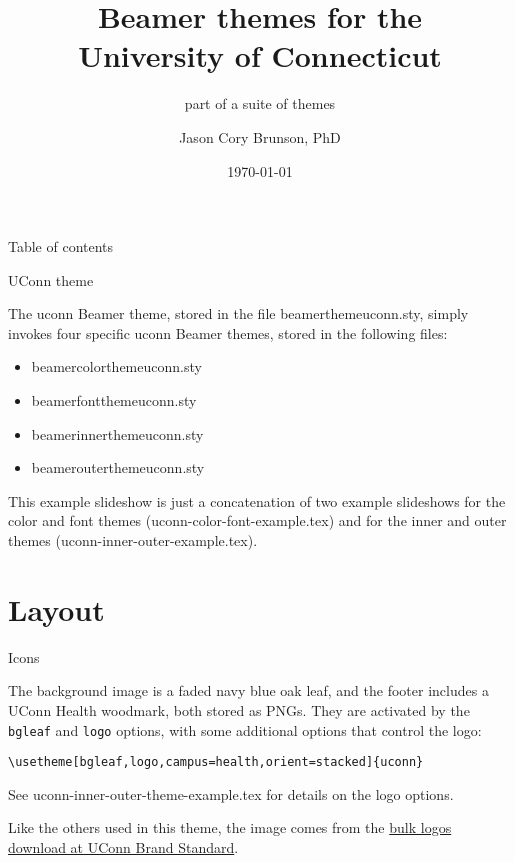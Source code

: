 \documentclass{beamer}
\title[Beamer themes for UConn]{Beamer themes for the\\ University of Connecticut}
\subtitle{part of a suite of themes}
\author[Cory Brunson]{Jason Cory Brunson, PhD}
\institute[UConn Health]{Center for Quantitative Medicine\\ University of Connecticut School of Medicine}
\date{\today}
\begin{document}
\begin{frame}
\titlepage
\end{frame}


\begin{frame}{Table of contents}
\tableofcontents
\end{frame}


\begin{frame}{UConn theme}

The {\ttfamily uconn} Beamer theme, stored in the file {\ttfamily beamerthemeuconn.sty}, simply invokes four specific {\ttfamily uconn} Beamer themes, stored in the following files:
\begin{itemize}
\ttfamily
\item beamercolorthemeuconn.sty
\item beamerfontthemeuconn.sty
\item beamerinnerthemeuconn.sty
\item beamerouterthemeuconn.sty
\end{itemize}

This example slideshow is just a concatenation of two example slideshows for the color and font themes ({\ttfamily uconn-color-font-example.tex}) and for the inner and outer themes ({\ttfamily uconn-inner-outer-example.tex}).

\end{frame}


\section{Layout}


\begin{frame}[fragile]{Icons}

The background image is a faded navy blue oak leaf, and the footer includes a UConn Health woodmark, both stored as PNGs.
They are activated by the \verb|bgleaf| and \verb|logo| options, with some additional options that control the logo:

\begin{verbatim}
\usetheme[bgleaf,logo,campus=health,orient=stacked]{uconn}
\end{verbatim}

See {\ttfamily uconn-inner-outer-theme-example.tex} for details on the logo options.

Like the others used in this theme, the image comes from the \href{https://brand.uconn.edu/downloads/logos/}{bulk logos download at UConn Brand Standard}.

\end{frame}
\end{document}
